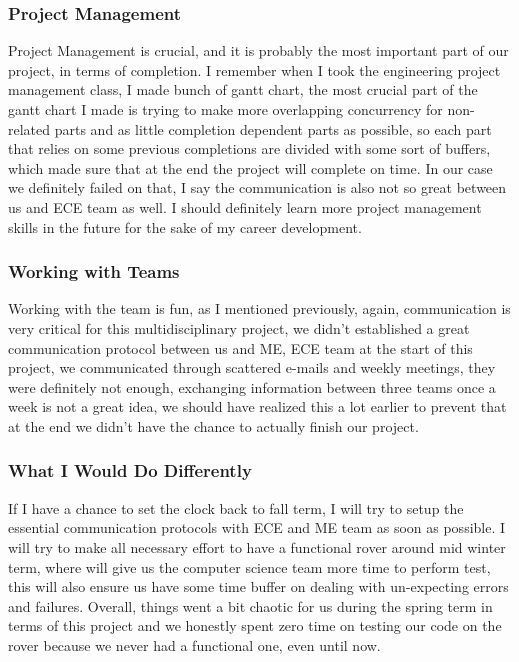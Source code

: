 \documentclass[10pt,letterpaper,onecolumn,draftclsnofoot,journal]{IEEEtran}
\begin{document}
\subsubsection{\textbf{Project Management}}
Project Management is crucial, and it is probably the most important part of our project, in terms of completion. I remember when I took the engineering project management class, I made bunch of gantt chart, the most crucial part of the gantt chart I made is trying to make more overlapping concurrency for non-related parts and as little completion dependent parts as possible, so each part that relies on some previous completions are divided with some sort of buffers, which made sure that at the end the project will complete on time. In our case we definitely failed on that, I say the communication is also not so great between us and ECE team as well. I should definitely learn more project management skills in the future for the sake of my career development.
\vspace{.3cm}

\subsubsection{\textbf{Working with Teams}}
Working with the team is fun, as I mentioned previously, again, communication is very critical for this multidisciplinary project, we didn't established a great communication protocol between us and ME, ECE team at the start of this project, we communicated through scattered e-mails and weekly meetings, they were definitely not enough, exchanging information between three teams once a week is not a great idea, we should have realized this a lot earlier to prevent that at the end we didn't have the chance to actually finish our project.  
\vspace{.3cm}

\subsubsection{\textbf{What I Would Do Differently}}
If I have a chance to set the clock back to fall term, I will try to setup the essential communication protocols with ECE and ME team as soon as possible. I will try to make all necessary effort to have a functional rover around mid winter term, where will give us the computer science team more time to perform test, this will also ensure us have some time buffer on dealing with un-expecting errors and failures. Overall, things went a bit chaotic for us during the spring term in terms of this project and we honestly spent zero time on testing our code on the rover because we never had a functional one, even until now.   
\vspace{.3cm}
\end{document}
